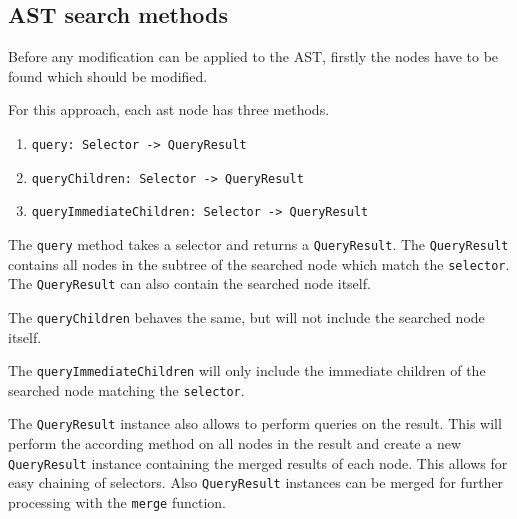 
\subsection{AST search methods}

Before any modification can be applied to the AST, firstly the nodes have to be found which should be modified.

For this approach, each ast node has three methods.

\begin{enumerate}
\item \verb|query: Selector -> QueryResult|
\item \verb|queryChildren: Selector -> QueryResult|
\item \verb|queryImmediateChildren: Selector -> QueryResult|
\end{enumerate}

The \verb|query| method takes a selector and returns a \verb|QueryResult|. The \verb|QueryResult| contains all nodes in the subtree of the searched node which match the \verb|selector|. The \verb|QueryResult| can also contain the searched node itself.

The \verb|queryChildren| behaves the same, but will not include the searched node itself.

The \verb|queryImmediateChildren| will only include the immediate children of the searched node matching the \verb|selector|.

The \verb|QueryResult| instance also allows to perform queries on the result. This will perform the according method on all nodes in the result and create a new \verb|QueryResult| instance containing the merged results of each node. This allows for easy chaining of selectors. Also \verb|QueryResult| instances can be merged for further processing with the \verb|merge| function.

